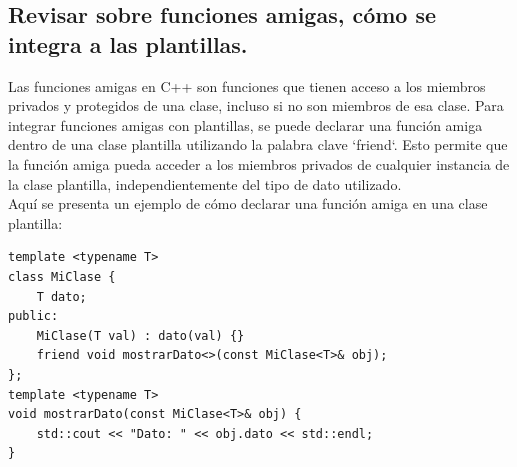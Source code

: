 \subsection{Revisar sobre funciones amigas, cómo se integra a las plantillas.}

Las funciones amigas en C++ son funciones que tienen acceso a los miembros privados y protegidos de una clase, incluso si no son miembros de esa clase. Para integrar funciones amigas con plantillas, se puede declarar una función amiga dentro de una clase plantilla utilizando la palabra clave `friend`. Esto permite que la función amiga pueda acceder a los miembros privados de cualquier instancia de la clase plantilla, independientemente del tipo de dato utilizado. \\

Aquí se presenta un ejemplo de cómo declarar una función amiga en una clase plantilla:
\begin{lstlisting}[style=cpp-style, caption={Función amiga en una clase plantilla}]
template <typename T>
class MiClase {
    T dato;
public:
    MiClase(T val) : dato(val) {}
    friend void mostrarDato<>(const MiClase<T>& obj);
};
template <typename T>
void mostrarDato(const MiClase<T>& obj) {
    std::cout << "Dato: " << obj.dato << std::endl;
}
\end{lstlisting}



